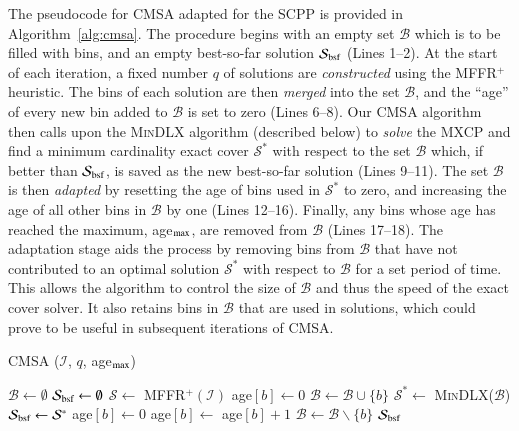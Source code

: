 \documentclass[a4paper,11pt,authoryear]{elsarticle}
\newcommand{\algorithmicto}{\textbf{ to }}
\newcommand{\To}{\algorithmicto}
\begin{document}
The pseudocode for CMSA adapted for the SCPP is provided in Algorithm~\ref{alg:cmsa}. The procedure begins with an empty set $\mathcal{B}$ which is to be filled with bins, and an empty best-so-far solution $\mathcal{S}_{\textup{bsf}}$ (Lines 1--2). At the start of each iteration, a fixed number $q$ of solutions are \emph{constructed} using the MFFR$^+$ heuristic. The bins of each solution are then \emph{merged} into the set $\mathcal{B}$, and the ``age'' of every new bin added to $\mathcal{B}$ is set to zero (Lines 6--8). Our CMSA algorithm then calls upon the \textsc{MinDLX} algorithm (described below) to \emph{solve} the MXCP and find a minimum cardinality exact cover $\mathcal{S}^*$ with respect to the set $\mathcal{B}$ which, if better than $\mathcal{S}_{\textup{bsf}}$, is saved as the new best-so-far solution (Lines 9--11). The set $\mathcal{B}$ is then \emph{adapted} by resetting the age of bins used in $\mathcal{S}^*$ to zero, and increasing the age of all other bins in $\mathcal{B}$ by one (Lines 12--16). Finally, any bins whose age has reached the maximum, age$_{\textup{max}}$, are removed from $\mathcal{B}$ (Lines 17--18). The adaptation stage aids the process by removing bins from $\mathcal{B}$ that have not contributed to an optimal solution $\mathcal{S}^*$ with respect to $\mathcal{B}$ for a set period of time. This allows the algorithm to control the size of $\mathcal{B}$ and thus the speed of the exact cover solver. It also retains bins in $\mathcal{B}$ that are used in solutions, which could prove to be useful in subsequent iterations of CMSA.

\begin{algorithm}[h!]
\caption{CMSA ($\mathcal{I}$, $q$, age$_\textup{max}$)}
\small
\begin{algorithmic}[1]
	\State $\mathcal{B} \gets \emptyset$
	\State $\mathcal{S}_{\textup{bsf}} \gets \emptyset$
		\For{$i\gets 1 \To q$}
			\State $\mathcal{S} \gets$ MFFR$^+(\mathcal{I})$
				\State age$[b] \gets 0$
				\State $\mathcal{B} \gets \mathcal{B} \cup \{b\}$
			\EndFor
		\EndFor
		\State $\mathcal{S}^* \gets$ \textsc{MinDLX}($\mathcal{B}$)
			\State $\mathcal{S}_{\textup{bsf}} \gets \mathcal{S}^*$
		\EndIf
				\State age$[b] \gets 0$
				\State age$[b] \gets$ age$[b] + 1$
					\State $\mathcal{B} \gets \mathcal{B} \backslash \{b\}$
				\EndIf
			\EndIf		
		\EndFor
	\EndWhile
	\Return $\mathcal{S}_{\textup{bsf}}$
\end{algorithmic}
\label{alg:cmsa}	
\end{algorithm}	
\end{document}
